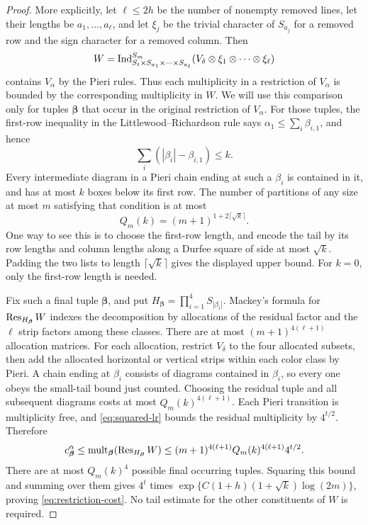 \begin{proof}
More explicitly, let $\ell\le2h$ be the number of nonempty removed
lines, let their lengths be $a_1,\ldots,a_\ell$, and let $\xi_j$ be
the trivial character of $S_{a_j}$ for a removed row and the sign
character for a removed column. Then
\[
 W=\operatorname{Ind}_{S_t\times S_{a_1}\times\cdots\times S_{a_\ell}}^{S_m}
       (V_\delta\otimes\xi_1\otimes\cdots\otimes\xi_\ell)
\]
contains $V_\alpha$ by the Pieri rules. Thus each multiplicity in a restriction of
$V_\alpha$ is bounded by the corresponding multiplicity in $W$.
We will use this comparison only for tuples $\boldsymbol\beta$
that occur in the original restriction of $V_\alpha$. For those
tuples, the first-row inequality in the Littlewood--Richardson rule says
$\alpha_1\le\sum_i\beta_{i,1}$, and hence
\begin{equation}\label{eq:tail-budget}
 \sum_i(|\beta_i|-\beta_{i,1})\le k.
\end{equation}
Every intermediate diagram in a Pieri chain ending at such a $\beta_i$ is contained in it, and has at most $k$ boxes below its first row. The number of partitions of any size at most $m$ satisfying that condition is at most
\[
 Q_m(k)=(m+1)^{1+2\lceil\sqrt{k}\rceil}.
\]
One way to see this is to choose the first-row length, and encode the tail by its row lengths and column lengths along a Durfee square of side at most $\sqrt k$. Padding the two lists to length $\lceil\sqrt k\rceil$ gives the displayed upper bound. For $k=0$, only the first-row length is needed.

Fix such a final tuple $\boldsymbol\beta$, and put
$H_{\boldsymbol\beta}=\prod_{i=1}^4S_{|\beta_i|}$.
Mackey's formula for $\operatorname{Res}_{H_{\boldsymbol\beta}}W$ indexes the decomposition by
allocations of the residual factor and the $\ell$ strip factors
among these classes. There are at most $(m+1)^{4(\ell+1)}$
allocation matrices. For each allocation, restrict $V_\delta$ to
the four allocated subsets, then add the allocated horizontal or
vertical strips within each color class by Pieri. A chain ending
at $\beta_i$ consists of diagrams contained in $\beta_i$, so every
one obeys the small-tail bound just counted. Choosing the residual
tuple and all subsequent diagrams costs at most
$Q_m(k)^{4(\ell+1)}$. Each Pieri transition is multiplicity free,
and \eqref{eq:squared-lr} bounds the residual multiplicity by
$4^{t/2}$. Therefore
\[
 c^\alpha_{\boldsymbol\beta}
 \le \operatorname{mult}_{\boldsymbol\beta}(\operatorname{Res}_{H_{\boldsymbol\beta}}W)
 \le (m+1)^{4(\ell+1)}Q_m(k)^{4(\ell+1)}4^{t/2}.
\]
There are at most $Q_m(k)^4$ possible final occurring tuples.
Squaring this bound and summing over them gives $4^t$ times
$\exp\{C(1+h)(1+\sqrt k)\log(2m)\}$, proving
\eqref{eq:restriction-cost}. No tail estimate for the other
constituents of $W$ is required.
\end{proof}

